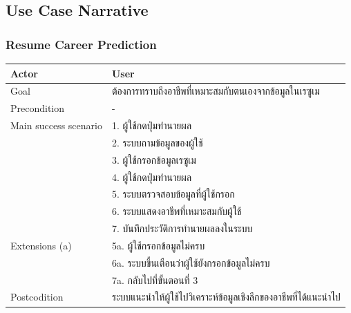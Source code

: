 \subsection{Use Case Narrative}
\subsubsection{Resume Career Prediction}
\begin{table}[H]
    \begin{tabular*}{\textwidth}{l|l} \hline
        Actor                 & User                                       \\ \hline
        Goal                  & ต้องการทราบถึงอาชีพที่เหมาะสมกับตนเองจากข้อมูลในเรซูเม            \\ \hline
        Precondition          & -                                               \\ \hline
        Main success scenario & 1. ผู้ใช้กดปุ่มทำนายผล                         \\
        & 2. ระบบถามข้อมูลของผู้ใช้                            \\
        & 3. ผู้ใช้กรอกข้อมูลเรซูเม                                  \\
        & 4. ผู้ใช้กดปุ่มทำนายผล                                \\
        & 5. ระบบตรวจสอบข้อมูลที่ผู้ใช้กรอก                           \\
        & 6. ระบบแสดงอาชีพที่เหมาะสมกับผู้ใช้                    \\
        & 7. บันทึกประวัติการทำนายผลลงในระบบ           \\ \hline
        Extensions (a)        & 5a. ผู้ใช้กรอกข้อมูลไม่ครบ                            \\
        & 6a. ระบบขึ้นเตือนว่าผู้ใช้ยังกรอกข้อมูลไม่ครบ              \\
        & 7a. กลับไปที่ขั้นตอนที่ 3                              \\ \hline
        Postcodition          & ระบบแนะนำให้ผู้ใช้ไปวิเคราะห์ข้อมูลเชิงลึกของอาชีพที่ได้แนะนำไป \\ \hline
    \end{tabular*}
\end{table}

